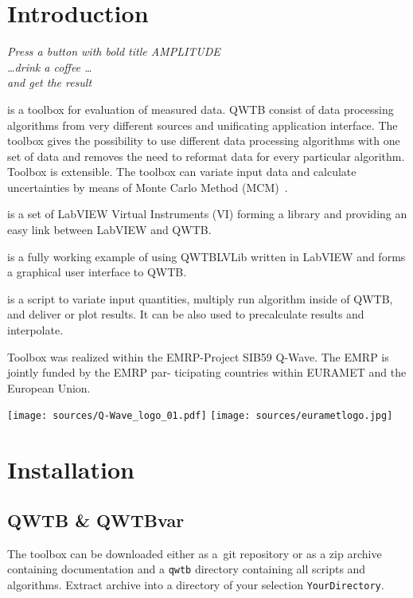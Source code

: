 \documentclass[12pt,a4paper,oneside]{report} %
\def\labview{{\sc LabVIEW}\xspace}
\begin{document}
\chapter{Introduction} %
\bigskip
\begin{center}
        \parbox{0.7\textwidth}{\textit{Press a button with bold title AMPLITUDE\\
        \dots drink a coffee \dots\\
        and get the result}}
\end{center}

\bigskip
{} is a toolbox for evaluation of measured data. QWTB consist of data
processing algorithms from very different sources and unificating application interface. The toolbox
gives the possibility to use different data processing algorithms with one set of data and removes
the need to reformat data for every particular algorithm. Toolbox is extensible. The toolbox
can variate input data and calculate uncertainties by means of Monte Carlo Method
(MCM)~\cite{JCGM2008}.

\bigskip
{} is a set of \labview Virtual Instruments (VI) forming a library and
providing an easy link between \labview and QWTB.

\bigskip
{} is a fully working example of using
QWTBLVLib written in \labview and forms a graphical user interface to QWTB.

\bigskip
{} is a script to variate input quantities, multiply run algorithm inside
of QWTB, and deliver or plot results. It can be also used to precalculate results and interpolate.

\bigskip
\noindent Toolbox was realized within the EMRP-Project SIB59 Q-Wave. The EMRP is jointly funded by the EMRP
par- ticipating countries within EURAMET and the European Union.

\vfill
\texttt{[image: sources/Q-Wave\_logo\_01.pdf]}
\hfill
\texttt{[image: sources/eurametlogo.jpg]}


\chapter{Installation} %
\section{QWTB \& QWTBvar} %
The toolbox can be downloaded either as a~{\sc git} repository or as a zip archive containing
documentation and a {\tt qwtb} directory containing all scripts and algorithms. Extract
archive into a directory of your selection {\tt YourDirectory}.
\end{document}
